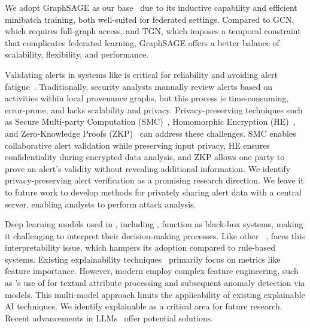  We adopt GraphSAGE as our base \gnnshort\ due to its inductive capability and efficient minibatch training, both well-suited for federated settings. Compared to GCN, which requires full-graph access, and TGN, which imposes a temporal constraint that complicates federated learning, GraphSAGE offers a better balance of scalability, flexibility, and performance.


 Validating alerts in systems like \Sys is critical for reliability and avoiding alert fatigue~\cite{nodoze2019}. Traditionally, security analysts manually review alerts based on activities within local provenance graphs, but this process is time-consuming, error-prone, and lacks scalability and privacy. Privacy-preserving techniques such as Secure Multi-party Computation (SMC)~\cite{goldreich1998secure}, Homomorphic Encryption (HE)~\cite{yi2014homomorphic}, and Zero-Knowledge Proofs (ZKP)~\cite{fiege1987zero} can address these challenges. SMC enables collaborative alert validation while preserving input privacy, HE ensures confidentiality during encrypted data analysis, and ZKP allows one party to prove an alert's validity without revealing additional information. We identify privacy-preserving alert verification as a promising research direction. We leave it to future work to develop methods for privately sharing alert data with a central server, enabling analysts to perform attack analysis.

 Deep learning models used in \pids, including \Sys, function as black-box systems, making it challenging to interpret their decision-making processes. Like other \pids~\cite{flash2024,cheng2023kairos,yangprographer}, \Sys faces this interpretability issue, which hampers its adoption compared to rule-based systems. Existing explainability techniques~\cite{antwarg2021explaining,brown2018recurrent,ardito2021revisiting,hwang2021sfd} primarily focus on metrics like feature importance. However, modern \pids employ complex feature engineering, such as \flash's use of \wordvec for textual attribute processing and subsequent anomaly detection via \gnnshort models. This multi-model approach limits the applicability of existing explainable AI techniques. We identify explainable \pids as a critical area for future research. Recent advancements in LLMs~\cite{chang2024survey} offer potential solutions.




